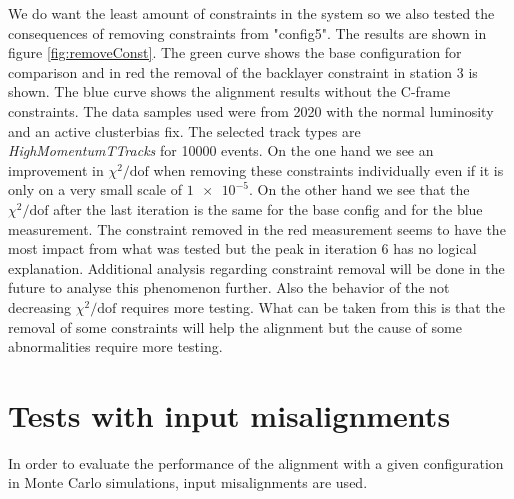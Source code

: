 We do want the least amount of constraints in the system so we also tested
the consequences of removing constraints from "config5".
The results are shown in figure \ref{fig:removeConst}.
The green curve shows the base configuration for comparison and in red the removal of the backlayer constraint in station 3 is shown. The blue curve shows the alignment results without the C-frame constraints.
The data samples used were from 2020 with the normal luminosity and an active clusterbias fix.
The selected track types are \textit{HighMomentumTTracks} for 10000 events.
On the one hand we see an improvement in $\chi^2 / \text{dof}$ when removing these constraints individually even if it is only on a very small scale of $\num{1e-5}$. On the
other hand we see that the $\chi^2 / \text{dof}$ after the last iteration is the same for the base config and for the blue measurement. The constraint removed in the red measurement seems to have the most impact from what was tested but the peak in iteration 6 has no logical
explanation. Additional analysis regarding constraint removal will be done in the future to analyse this phenomenon further.
Also the behavior of the not decreasing $\chi^2 / \text{dof}$ requires more testing.
What can be taken from this is that the removal of some constraints will help
the alignment but the cause of some abnormalities require more testing.

\section{Tests with input misalignments}
In order to evaluate the performance of the alignment with a given configuration in Monte Carlo simulations, input misalignments are used.
